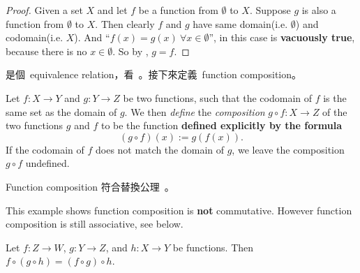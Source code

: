 \begin{proof}
Given a set \(X\) and let \(f\) be a function from \(\emptyset\) to \(X\). Suppose \(g\) is also a function from \(\emptyset\) to \(X\). Then clearly \(f\) and \(g\) have same domain(i.e. \(\emptyset\)) and codomain(i.e. \(X\)). And ``\(f(x) = g(x)\ \forall x \in \emptyset\)'', in this case is \textbf{vacuously true}, because there is no \(x \in \emptyset\). So by , \(g = f\).
\end{proof}

\begin{note}
 是個\ equivalence relation，看\ 。接下來定義\ function composition。
\end{note}

\begin{definition} [Composition] \label{def 3.3.10}
Let \(f : X \rightarrow Y\) and \(g : Y \rightarrow Z\) be two functions, such that the codomain of \(f\) is the same set as the domain of \(g\). We then \emph{define} the \emph{composition} \(g \circ f : X \rightarrow Z\) of the two functions \(g\) and \(f\) to be the function \textbf{defined explicitly by the formula}
\[
    (g \circ f)(x) := g(f(x)).
\]
If the codomain of \(f\) does not match the domain of \(g\), we leave the composition \(g \circ f\) undefined.
\end{definition}

\begin{note}
Function composition 符合替換公理\ 。
\end{note}

\begin{example}
This example shows function composition is \textbf{not} commutative. However function composition is still associative, see below.
\end{example}

\begin{lemma}  \label{lem 3.3.12}
Let \(f : Z \rightarrow W\), \(g : Y \rightarrow Z\), and \(h : X \rightarrow Y\) be functions. Then \(f \circ (g \circ h) = (f \circ g) \circ h\).
\end{lemma}

